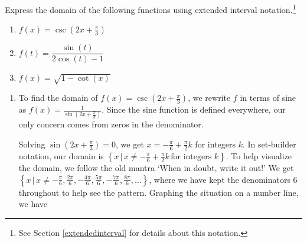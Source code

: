 \documentclass{ximera}
\begin{document}
\begin{example}  \label{TrigDomainEx1} Express the domain of the following functions using extended interval notation.\footnote{See Section \ref{extendedinterval} for details about this notation.}



\begin{enumerate}

\item  $f(x) = \csc\left(2x + \frac{\pi}{3}\right)$

\item  $f(t) = \dfrac{\sin(t)}{2\cos(t) - 1}$

\item  $f(x) = \sqrt{1 - \cot(x)}$

\end{enumerate}


\begin{explanation}

\begin{enumerate}

\item  To find the domain of $f(x) = \csc\left(2x + \frac{\pi}{3}\right)$, we rewrite $f$ in terms of sine as $f(x) = \frac{1}{\sin\left(2x + \frac{\pi}{3}\right)}$.  Since the sine function is defined everywhere, our only concern comes from zeros in the denominator.  

 

Solving $\sin\left(2x + \frac{\pi}{3}\right) = 0$, we get $x = -\frac{\pi}{6} + \frac{\pi}{2} k$ for integers $k$.  In set-builder notation, our domain is  $\left\{ x \, | \, x  \neq  -\frac{\pi}{6} + \frac{\pi}{2} k \, \text{for integers $k$} \right\}$.  To help visualize the domain,  we follow the old mantra `When in doubt, write it out!' We get $\left\{ x \, | \, x  \neq  -\frac{\pi}{6}, \frac{2\pi}{6}, -\frac{4\pi}{6}, \frac{5\pi}{6}, -\frac{7\pi}{6}, \frac{8\pi}{6}, \ldots \right\}$, where we have kept the denominators $6$ throughout to help see the pattern.  Graphing the situation on a number line, we have

\begin{image}
\end{image}
\end{enumerate}
\end{explanation}
\end{example}
\end{document}
